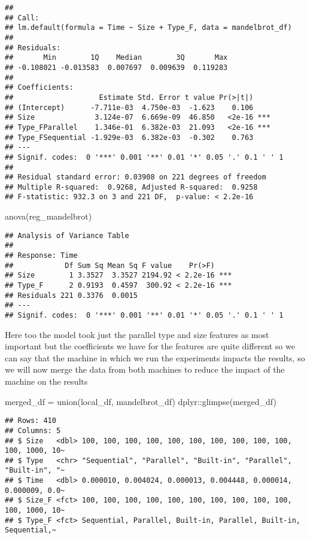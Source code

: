 \documentclass[
]{article}
\newenvironment{Shaded}{\begin{snugshade}}{\end{snugshade}}
\newcommand{\FunctionTok}[1]{\textcolor[rgb]{0.00,0.00,0.00}{#1}}
\newcommand{\NormalTok}[1]{#1}
\newcommand{\OtherTok}[1]{\textcolor[rgb]{0.56,0.35,0.01}{#1}}
\newcommand{\SpecialCharTok}[1]{\textcolor[rgb]{0.00,0.00,0.00}{#1}}
\begin{document}
\begin{verbatim}
## 
## Call:
## lm.default(formula = Time ~ Size + Type_F, data = mandelbrot_df)
## 
## Residuals:
##       Min        1Q    Median        3Q       Max 
## -0.108021 -0.013583  0.007697  0.009639  0.119283 
## 
## Coefficients:
##                    Estimate Std. Error t value Pr(>|t|)    
## (Intercept)      -7.711e-03  4.750e-03  -1.623    0.106    
## Size              3.124e-07  6.669e-09  46.850   <2e-16 ***
## Type_FParallel    1.346e-01  6.382e-03  21.093   <2e-16 ***
## Type_FSequential -1.929e-03  6.382e-03  -0.302    0.763    
## ---
## Signif. codes:  0 '***' 0.001 '**' 0.01 '*' 0.05 '.' 0.1 ' ' 1
## 
## Residual standard error: 0.03908 on 221 degrees of freedom
## Multiple R-squared:  0.9268, Adjusted R-squared:  0.9258 
## F-statistic: 932.3 on 3 and 221 DF,  p-value: < 2.2e-16
\end{verbatim}

\begin{Shaded}
\begin{Highlighting}[]
\FunctionTok{anova}\NormalTok{(reg\_mandelbrot)}
\end{Highlighting}
\end{Shaded}

\begin{verbatim}
## Analysis of Variance Table
## 
## Response: Time
##            Df Sum Sq Mean Sq F value    Pr(>F)    
## Size        1 3.3527  3.3527 2194.92 < 2.2e-16 ***
## Type_F      2 0.9193  0.4597  300.92 < 2.2e-16 ***
## Residuals 221 0.3376  0.0015                      
## ---
## Signif. codes:  0 '***' 0.001 '**' 0.01 '*' 0.05 '.' 0.1 ' ' 1
\end{verbatim}

Here too the model took just the parallel type and size features as most
important but the coefficients we have for the features are quite
different so we can say that the machine in which we run the experiments
impacts the results, so we will now merge the data from both machines to
reduce the impact of the machine on the results

\begin{Shaded}
\begin{Highlighting}[]
\NormalTok{merged\_df }\OtherTok{=} \FunctionTok{union}\NormalTok{(local\_df, mandelbrot\_df)}
\NormalTok{dplyr}\SpecialCharTok{::}\FunctionTok{glimpse}\NormalTok{(merged\_df)}
\end{Highlighting}
\end{Shaded}

\begin{verbatim}
## Rows: 410
## Columns: 5
## $ Size   <dbl> 100, 100, 100, 100, 100, 100, 100, 100, 100, 100, 100, 1000, 10~
## $ Type   <chr> "Sequential", "Parallel", "Built-in", "Parallel", "Built-in", "~
## $ Time   <dbl> 0.000010, 0.004024, 0.000013, 0.004448, 0.000014, 0.000009, 0.0~
## $ Size_F <fct> 100, 100, 100, 100, 100, 100, 100, 100, 100, 100, 100, 1000, 10~
## $ Type_F <fct> Sequential, Parallel, Built-in, Parallel, Built-in, Sequential,~
\end{verbatim}
\end{document}
